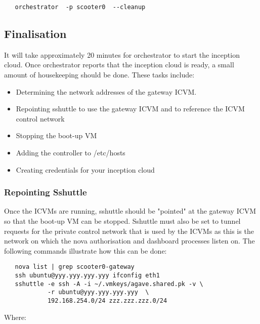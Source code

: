 \small\begin{verbatim}
   orchestrator  -p scooter0  --cleanup 
\end{verbatim}\normalsize

\subsection{Finalisation}
It will take approximately 20 minutes for orchestrator to start the inception cloud.
Once orchestrator reports that the inception cloud is ready, a small amount of housekeeping should be done. 
These tasks include:

\begin{itemize}
\item Determining the network addresses of the gateway ICVM.

\item Repointing sshuttle to use the gateway ICVM and to reference the ICVM control network

\item Stopping the boot-up VM

\item Adding the controller to /etc/hosts

\item Creating credentials for your inception cloud
\end{itemize}

\subsubsection{Repointing Sshuttle}
Once the ICVMs are running, sshuttle should be "pointed" at the gateway ICVM so that the boot-up VM can be stopped. 
Sshuttle must also be set to tunnel requests for the private control network that is used by the 
ICVMs as this is the network on which the nova authorisation and dashboard processes listen on. 
The following commands illustrate how this can be done:  

\small\begin{verbatim}
   nova list | grep scooter0-gateway          
   ssh ubuntu@yyy.yyy.yyy.yyy ifconfig eth1   
   sshuttle -e ssh -A -i ~/.vmkeys/agave.shared.pk -v \
            -r ubuntu@yyy.yyy.yyy.yyy  \
            192.168.254.0/24 zzz.zzz.zzz.0/24

\end{verbatim}\normalsize
\noindent
Where:

\dlbeg{0.9in}

